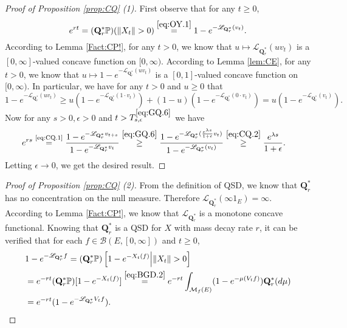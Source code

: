 \documentclass[12pt,a4paper]{amsart}
\numberwithin{equation}{section}
\theoremstyle{plain}
\theoremstyle{definition}
\theoremstyle{remark}
\begin{document}
\begin{proof}[Proof of Proposition \ref{prop:CQ} (1)]
	First observe that for any $t\geq 0$,
	\begin{equation} \label{eq:CQ.1}
	e^{rt} = (\mathbf Q_r^*\mathbb P)(\|X_t\|>0)
	\overset{\eqref{eq:OY.1}}= 1 - e^{- \mathscr L_{\mathbf Q_r^*}(v_t)}.
	\end{equation}
	According to Lemma \ref{Fact:CP!}, for any $t>0$, we know that $u\mapsto \mathscr L_{\mathbf Q_r^*} (uv_t)$ is a $[0,\infty]$-valued concave function on $[0,\infty)$.
	According to Lemma \ref{lem:CE}, for any $t>0$, we know that $u \mapsto 1 - e^{- \mathscr L_{\mathbf Q_r^*}(uv_t)}$ is a $[0,1]$-valued concave function on $[0, \infty)$.
	In particular, we have for any $t>0$ and $u \geq 0$ that
	\begin{equation} \label{eq:CQ.2}
		1 - e^{- \mathscr L_{\mathbf Q_r^*}(uv_t)} \geq u(1 - e^{- \mathscr L_{\mathbf Q_r^*}(1\cdot v_t)}) + (1-u) (1 - e^{- \mathscr L_{\mathbf Q_r^*}(0 \cdot v_t)})  = u(1 - e^{- \mathscr L_{\mathbf Q_r^*}(v_t)}).
	\end{equation}
	Now for any $s>0, \epsilon > 0$ and $t > T^{\eqref{eq:GQ.6}}_{s, \epsilon}$ we have
	\begin{align}
	& e^{rs} \overset{\text{\eqref{eq:CQ.1}}}= \frac{1 - e^{-\mathscr L_{\mathbf Q_r^*}v_{t+s}}}{1 - e^{-\mathscr L_{\mathbf Q_r^*}v_{t}}}
	\overset{\eqref{eq:GQ.6}}\geq \frac{1 - e^{-\mathscr L_{\mathbf Q_r^*}( \frac{e^{\lambda s}}{1+\epsilon}v_t )}}{1 - e^{-\mathscr L_{\mathbf Q_r^*}(v_{t})}}
	\overset{\eqref{eq:CQ.2}}\geq \frac{e^{\lambda s}}{1+\epsilon}.
	\end{align}
	Letting $\epsilon \to 0$, we get the desired result.
\end{proof}

\begin{proof}[Proof of Proposition \ref{prop:CQ} (2)]
	From the definition of QSD, we know that $\mathbf Q_r^*$ has no concentration on the null measure.
	Therefore $\mathscr L_{\mathbf Q_r^*}(\infty  1_E) = \infty$.
	According to Lemma \ref{Fact:CP!}, we know that $\mathscr L_{\mathbf Q_r^*}$ is a monotone concave functional.
	Knowing that $\mathbf Q^*_r$ is a QSD for $X$ with mass decay rate $r$, it can be verified that for each $f\in \mathcal B(E,[0,\infty])$ and $t\geq 0$,
	\begin{align}
	&1 - e^{-\mathscr L_{\mathbf Q_r^*}f}
	= (\mathbf Q_r^* \mathbb P) \left[1 - e^{-X_t(f)} \middle|\|X_t\|>0 \right]
	\\&= e^{-rt}(\mathbf Q_r^*\mathbb P)[1 - e^{- X_t(f)}]
	\overset{\eqref{eq:BGD.2}}= e^{-rt} \int_{\mathcal M_f(E)} (1 - e^{-\mu(V_tf)}) \mathbf Q_r^*(d\mu)
	\\&= e^{-rt} (1 - e^{- \mathscr L_{\mathbf Q_r^*}V_tf}).
	\qedhere
	\end{align}
	
\end{proof}
\end{document}
